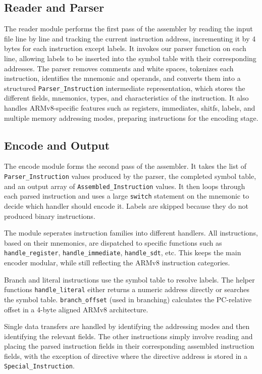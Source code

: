\documentclass{article}
\begin{document}
\subsection{Reader and Parser}

The reader module performs the first pass of the assembler by reading the input file line by line and tracking the current instruction address, incrementing it by 4 bytes for each instruction except labels. It invokes our parser function on each line, allowing labels to be inserted into the symbol table with their corresponding addresses. The parser removes comments and white spaces, tokenizes  each instruction, identifies the mnemonic and operands, and converts them into a structured \verb|Parser_Instruction| intermediate representation, which stores the different fields, mnemonics, types, and characteristics of the instruction. It also handles ARMv8-specific features such as registers, immediates, shitfs, labels, and multiple memory addressing modes, preparing instructions for the encoding stage. 

\subsection{Encode and Output}

 The encode module forms the second pass of the assembler. It takes the list of \verb|Parser_Instruction| values produced by the parser, the completed symbol table, and an output array of \verb|Assembled_Instruction| values. It then loops through each parsed instruction and uses a large \verb|switch| statement on the mnemonic to decide which handler should encode it. Labels are skipped because they do not produced binary instructions.

 The module seperates instruction families into different handlers. All instructions, based on their mnemonics, are dispatched to specific functions such as \verb|handle_register|, \verb|handle_immediate|, \verb|handle_sdt|, etc. This keeps the main encoder modular, while still reflecting the ARMv8 instruction categories.

Branch and literal instructions use the symbol table to resolve labels. The helper functions \verb|handle_literal| either returns a numeric address directly or searches the symbol table. \verb|branch_offset| (used in branching) calculates the PC-relative offset in a 4-byte aligned ARMv8 architecture.

Single data transfers are handled by identifying the addressing modes and then identifying the relevant fields. The other instructions simply involve reading and placing the parsed instruction fields in their corresponding assembled instruction fields, with the exception of directive where the directive address is stored in a \verb|Special_Instruction|.
\end{document}
